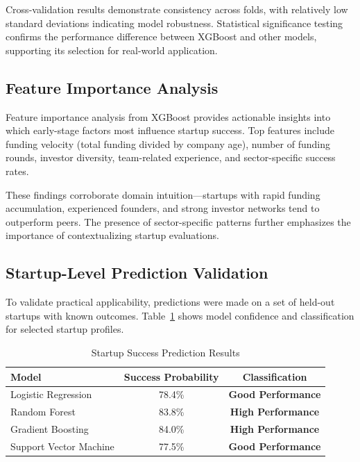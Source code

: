\documentclass[conference]{IEEEtran}
\begin{document}
Cross-validation results demonstrate consistency across folds, with relatively low standard deviations indicating model robustness. Statistical significance testing confirms the performance difference between XGBoost and other models, supporting its selection for real-world application.

\subsection{Feature Importance Analysis}

Feature importance analysis from XGBoost provides actionable insights into which early-stage factors most influence startup success. Top features include funding velocity (total funding divided by company age), number of funding rounds, investor diversity, team-related experience, and sector-specific success rates.

These findings corroborate domain intuition—startups with rapid funding accumulation, experienced founders, and strong investor networks tend to outperform peers. The presence of sector-specific patterns further emphasizes the importance of contextualizing startup evaluations.

\subsection{Startup-Level Prediction Validation}

To validate practical applicability, predictions were made on a set of held-out startups with known outcomes. Table~\ref{tab:success-prediction} shows model confidence and classification for selected startup profiles.

\begin{table}[H]
\centering
\caption{Startup Success Prediction Results}
\begin{tabular}{|l|c|c|}
\hline
\textbf{Model} & \textbf{Success Probability} & \textbf{Classification} \\
\hline
Logistic Regression & 78.4\% & \cellcolor{orange!25}\textbf{Good Performance} \\
Random Forest       & 83.8\% & \cellcolor{green!25}\textbf{High Performance} \\
Gradient Boosting   & 84.0\% & \cellcolor{green!25}\textbf{High Performance} \\
Support Vector Machine & 77.5\% & \cellcolor{orange!25}\textbf{Good Performance} \\
\hline
\end{tabular}
\label{tab:success-prediction}
\end{table}
\end{document}

